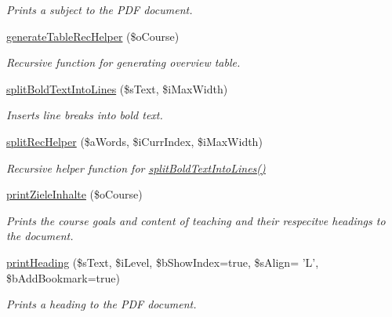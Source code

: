 \begin{DoxyCompactItemize}
\begin{DoxyCompactList}\small\item\em Prints a subject to the P\+D\+F document. \end{DoxyCompactList}\item 
\hyperlink{classoverview_p_d_f_ad0ea6c6476d690b08161300e40926dc6}{generate\+Table\+Rec\+Helper} (\$o\+Course)
\begin{DoxyCompactList}\small\item\em Recursive function for generating overview table. \end{DoxyCompactList}\item 
\hyperlink{classoverview_p_d_f_aa12feabadc0d4aa85bb4da7454f8245d}{split\+Bold\+Text\+Into\+Lines} (\$s\+Text, \$i\+Max\+Width)
\begin{DoxyCompactList}\small\item\em Inserts line breaks into bold text. \end{DoxyCompactList}\item 
\hyperlink{classoverview_p_d_f_af3f9a49de14251ba45bd046879f27aa2}{split\+Rec\+Helper} (\$a\+Words, \$i\+Curr\+Index, \$i\+Max\+Width)
\begin{DoxyCompactList}\small\item\em Recursive helper function for \hyperlink{classoverview_p_d_f_aa12feabadc0d4aa85bb4da7454f8245d}{split\+Bold\+Text\+Into\+Lines()} \end{DoxyCompactList}\item 
\hyperlink{classoverview_p_d_f_af0b14d64b47fe81df7965b8259ccb762}{print\+Ziele\+Inhalte} (\$o\+Course)
\begin{DoxyCompactList}\small\item\em Prints the course goals and content of teaching and their respecitve headings to the document. \end{DoxyCompactList}\item 
\hyperlink{classoverview_p_d_f_ad6b57d30526fb658521faddce7595dc4}{print\+Heading} (\$s\+Text, \$i\+Level, \$b\+Show\+Index=true, \$s\+Align= 'L', \$b\+Add\+Bookmark=true)
\begin{DoxyCompactList}\small\item\em Prints a heading to the P\+D\+F document. \end{DoxyCompactList}\end{DoxyCompactItemize}
